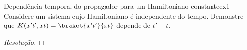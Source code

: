 \begin{exercício}{Dependência temporal do propagador para um Hamiltoniano constante}{ex1}
   Considere um sistema cujo Hamiltoniano é independente do tempo. Demonstre que \(K(x't'; xt) = \braket{x't'}{xt}\) depende de \(t' - t.\)
\end{exercício}
\begin{proof}[Resolução]
    
\end{proof}
